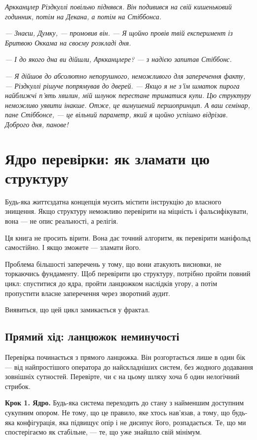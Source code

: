 \documentclass[12pt, a4paper, openany]{book}
\begin{document}
\begin{terrybox}
\textit{Аркканцлер Різдкуллі повільно піднявся. Він подивився на свій кишеньковий годинник, потім на Декана, а потім на Стіббонса.}

\textit{--- Знаєш, Думку, --- промовив він. --- Я щойно провів твій експеримент із Бритвою Оккама на своєму розкладі дня.}

\textit{--- І до якого дна ви дійшли, Аркканцлере? --- з надією запитав Стіббонс.}

\textit{--- Я дійшов до абсолютно непорушного, неможливого для заперечення факту, --- Різдкуллі рішуче попрямував до дверей. --- Якщо я не з'їм шматок пирога найближчі п'ять хвилин, мій шлунок перестане триматися купи. Цю структуру неможливо уявити інакше. Отже, це вимушений першопринцип. А ваш семінар, пане Стіббонсе, --- це вільний параметр, який я щойно успішно відрізав. Доброго дня, панове!}
\end{terrybox}


\chapter{Ядро перевірки: як зламати цю структуру}

Будь-яка життєздатна концепція мусить містити інструкцію до власного знищення. Якщо структуру неможливо перевірити на міцність і фальсифікувати, вона — не опис реальності, а релігія.

Ця книга не просить вірити. Вона дає точний алгоритм, як перевірити маніфольд самостійно. І якщо зможете — зламати його.

Проблема більшості заперечень у тому, що вони атакують висновки, не торкаючись фундаменту. Щоб перевірити цю структуру, потрібно пройти повний цикл: спуститися до ядра, пройти ланцюжком наслідків угору, а потім пропустити власне заперечення через зворотний аудит.

Виявиться, що цей цикл замикається у фрактал.

\section{Прямий хід: ланцюжок неминучості}

Перевірка починається з прямого ланцюжка. Він розгортається лише в один бік — від найпростішого оператора до найскладніших систем, без жодного додавання зовнішніх сутностей. Перевірте, чи є на цьому шляху хоча б один нелогічний стрибок.

\textbf{Крок 1. Ядро.} Будь-яка система переходить до стану з найменшим доступним сукупним опором. Не тому, що це правило, яке хтось нав'язав, а тому, що будь-яка конфігурація, яка підвищує опір і не дисипує його, розпадається. Те, що ми спостерігаємо як стабільне, — те, що уже знайшло свій мінімум.
\end{document}
